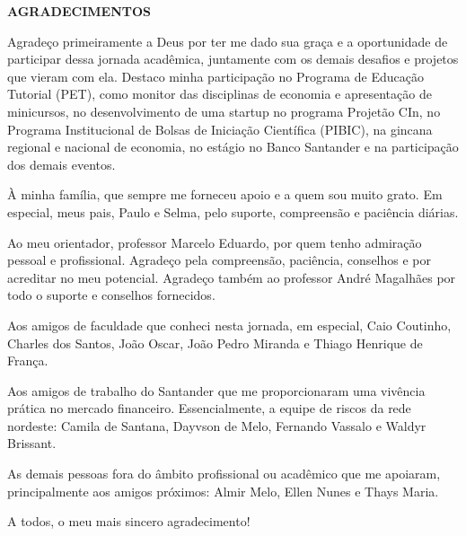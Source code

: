 \begin{center}
    \textbf{\uppercase{Agradecimentos}}
    \vspace{1cm}
\end{center}

Agradeço primeiramente a Deus por ter me dado sua graça e a oportunidade de participar dessa jornada acadêmica, juntamente com os demais desafios e projetos que vieram com ela. Destaco minha participação no Programa de Educação Tutorial (PET), como monitor das disciplinas de economia e apresentação de minicursos, no desenvolvimento de uma startup no programa Projetão CIn, no Programa Institucional de Bolsas de Iniciação Científica (PIBIC), na gincana regional e nacional de economia, no estágio no Banco Santander e na participação dos demais eventos.


À minha família, que sempre me forneceu apoio e a quem sou muito grato. Em especial, meus pais, Paulo e Selma, pelo suporte, compreensão e paciência diárias. 


Ao meu orientador, professor Marcelo Eduardo, por quem tenho admiração pessoal e profissional. Agradeço pela compreensão, paciência, conselhos e por acreditar no meu potencial. Agradeço também ao professor André Magalhães por todo o suporte e conselhos fornecidos. 


Aos amigos de faculdade que conheci nesta jornada, em especial, Caio Coutinho, Charles dos Santos, João Oscar, João Pedro Miranda e Thiago Henrique de França.


Aos amigos de trabalho do Santander que me proporcionaram uma vivência prática no mercado financeiro. Essencialmente, a equipe de riscos da rede nordeste: Camila de Santana, Dayvson de Melo, Fernando Vassalo e Waldyr Brissant.


As demais pessoas fora do âmbito profissional ou acadêmico que me apoiaram, principalmente aos amigos próximos: Almir Melo, Ellen Nunes e Thays Maria.


A todos, o meu mais sincero agradecimento!
    
\vspace*{\fill}
\thispagestyle{empty}